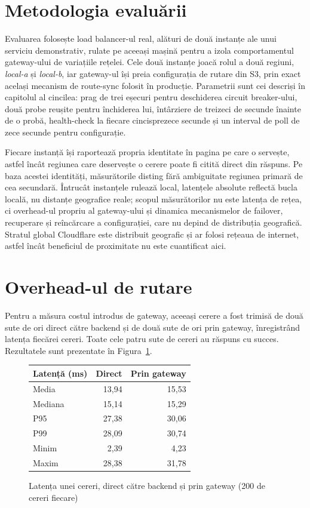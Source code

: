 \documentclass[12pt,a4paper]{report}
\begin{document}
\section{Metodologia evaluării}
Evaluarea folosește load balancer-ul real, alături de două instanțe ale unui serviciu demonstrativ, rulate pe aceeași mașină pentru a izola comportamentul gateway-ului de variațiile rețelei. Cele două instanțe joacă rolul a două regiuni, \emph{local-a} și \emph{local-b}, iar gateway-ul își preia configurația de rutare din S3, prin exact același mecanism de route-sync folosit în producție. Parametrii sunt cei descriși în capitolul al cincilea: prag de trei eșecuri pentru deschiderea circuit breaker-ului, două probe reușite pentru închiderea lui, întârziere de treizeci de secunde înainte de o probă, health-check la fiecare cincisprezece secunde și un interval de poll de zece secunde pentru configurație.

Fiecare instanță își raportează propria identitate în pagina pe care o servește, astfel încât regiunea care deservește o cerere poate fi citită direct din răspuns. Pe baza acestei identități, măsurătorile disting fără ambiguitate regiunea primară de cea secundară. Întrucât instanțele rulează local, latențele absolute reflectă bucla locală, nu distanțe geografice reale; scopul măsurătorilor nu este latența de rețea, ci overhead-ul propriu al gateway-ului și dinamica mecanismelor de failover, recuperare și reîncărcare a configurației, care nu depind de distribuția geografică. Stratul global Cloudflare este distribuit geografic și ar folosi rețeaua de internet, astfel încât beneficiul de proximitate nu este cuantificat aici.

\section{Overhead-ul de rutare}
Pentru a măsura costul introdus de gateway, aceeași cerere a fost trimisă de două sute de ori direct către backend și de două sute de ori prin gateway, înregistrând latența fiecărei cereri. Toate cele patru sute de cereri au răspuns cu succes. Rezultatele sunt prezentate în Figura~\ref{fig:overhead}.

\begin{figure}[H]
\centering
\begin{tabular}{@{}p{4.2cm}rr@{}}
\toprule
\textbf{Latență (ms)} & \textbf{Direct} & \textbf{Prin gateway} \\
\midrule
Media        & 13,94 & 15,53 \\
Mediana      & 15,14 & 15,29 \\
P95          & 27,38 & 30,06 \\
P99          & 28,09 & 30,74 \\
Minim        & 2,39  & 4,23  \\
Maxim        & 28,38 & 31,78 \\
\bottomrule
\end{tabular}
\caption{Latența unei cereri, direct către backend și prin gateway (200 de cereri fiecare)}
\label{fig:overhead}
\end{figure}
\end{document}
